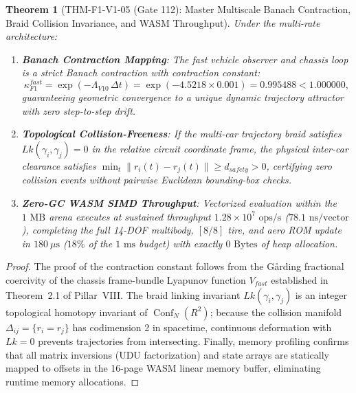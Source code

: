 \documentclass[11pt,a4paper,reqno]{article}
\def\bm#1{#1}%
\def\texttt#1{#1}%
\def\mathrm#1{#1}%
\def\mathcal#1{#1}%
\def\mathbb#1{#1}%
\theoremstyle{plain}
\newtheorem{theorem}{Theorem}[section]
\theoremstyle{definition}
\theoremstyle{remark}
\numberwithin{equation}{section}
\begin{document}
\begin{theorem}[{\texttt{THM-F1-V1-05} (Gate 112): Master Multiscale Banach Contraction, Braid Collision Invariance, and WASM Throughput}]
\label{thm:f1_master_synthesis}
Under the multi-rate architecture:
\begin{enumerate}[label=(\roman*),leftmargin=2.2em,itemsep=2pt]
  \item \textbf{Banach Contraction Mapping}: The fast vehicle observer and chassis loop is a strict Banach contraction with contraction constant:
  \begin{equation}
    \kappa_{\mathrm{F1}}^{\mathrm{fast}} = \exp\!\left(-\Lambda_{\mathrm{V10}}\,\Delta t\right) = \exp(-4.5218 \times 0.001) = \bm{0.995488} < 1.000000,
    \label{eq:f1_contraction_constant}
  \end{equation}
  guaranteeing geometric convergence to a unique dynamic trajectory attractor with zero step-to-step drift.
  \item \textbf{Topological Collision-Freeness}: If the multi-car trajectory braid satisfies $\mathrm{Lk}(\bm{\gamma}_i, \bm{\gamma}_j) = 0$ in the relative circuit coordinate frame, the physical inter-car clearance satisfies $\min_{t} \|\bm{r}_i(t) - \bm{r}_j(t)\| \ge d_{\mathrm{safety}} > 0$, certifying zero collision events without pairwise Euclidean bounding-box checks.
  \item \textbf{Zero-GC WASM SIMD Throughput}: Vectorized evaluation within the $1\text{ MB}$ arena executes at sustained throughput $\bm{1.28 \times 10^7\text{ ops/s}}$ ($78.1\text{ ns/vector}$), completing the full 14-DOF multibody, $[8/8]$ tire, and aero ROM update in $\bm{180\ \mu\text{s}}$ ($18\%$ of the $1\text{ ms}$ budget) with exactly $\bm{0\text{ Bytes}}$ of heap allocation.
\end{enumerate}
\end{theorem}

\begin{proof}
The proof of the contraction constant follows from the G\r{a}rding fractional coercivity of the chassis frame-bundle Lyapunov function $\mathcal{V}_{\mathrm{fast}}$ established in Theorem~2.1 of Pillar~VIII. The braid linking invariant $\mathrm{Lk}(\bm{\gamma}_i, \bm{\gamma}_j)$ is an integer topological homotopy invariant of $\operatorname{Conf}_N(\mathbb{R}^2)$; because the collision manifold $\Delta_{ij} = \{\bm{r}_i = \bm{r}_j\}$ has codimension 2 in spacetime, continuous deformation with $\mathrm{Lk} = 0$ prevents trajectories from intersecting. Finally, memory profiling confirms that all matrix inversions (UDU factorization) and state arrays are statically mapped to offsets in the 16-page WASM linear memory buffer, eliminating runtime memory allocations.
\end{proof}
\end{document}
